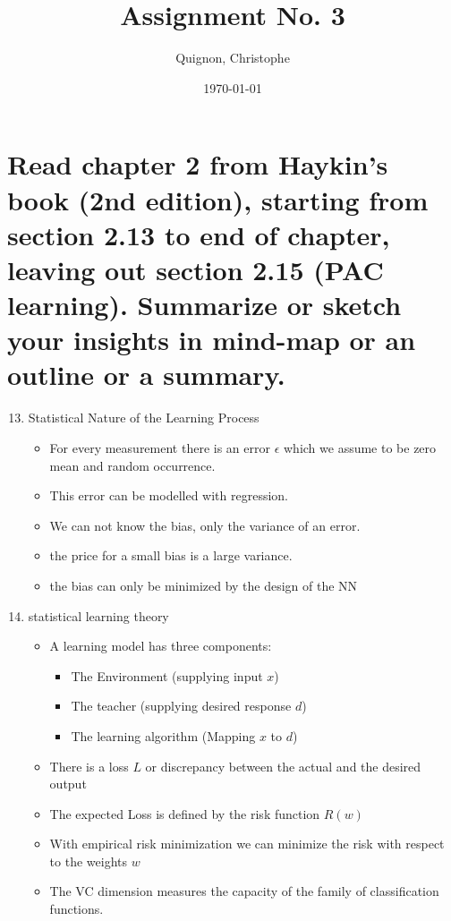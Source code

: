 \documentclass{scrartcl}
\begin{document}
\title{Assignment No. 3}
\subtitle{}
\author{
  Quignon, Christophe \\
} 
\date{\today}


\maketitle

\section{Read chapter 2 from Haykin’s book (2nd edition), starting from section 2.13 to end of
chapter, leaving out section 2.15 (PAC learning). Summarize or sketch your insights in
mind-map or an outline or a summary.
}
\begin{enumerate}
\setcounter{enumi}{12}
\item Statistical Nature of the Learning Process
	\begin{itemize}
	\item For every measurement there is an error $\epsilon$ which we assume to be zero mean and random occurrence.
	\item This error can be modelled with regression.
	\item We can not know the bias, only the variance of an error.
	\item the price for a small bias is a large variance.
	\item the bias can only be minimized by the design of the NN
	\end{itemize}
\item statistical learning theory
	\begin{itemize}
	\item A learning model has three components:
		\begin{itemize}
		\item The Environment (supplying input $x$)
		\item The teacher (supplying desired response $d$)
		\item The learning algorithm (Mapping $x$ to $d$)
		\end{itemize}
	\item There is a loss $L$ or discrepancy between the actual and the desired output
	\item The expected Loss is defined by the risk function $R(w)$
	\item With empirical risk minimization we can minimize the risk with respect to the weights $w$
	\item The VC dimension measures the capacity of the family of classification functions.

\end{itemize}
\end{enumerate}
\end{document}

